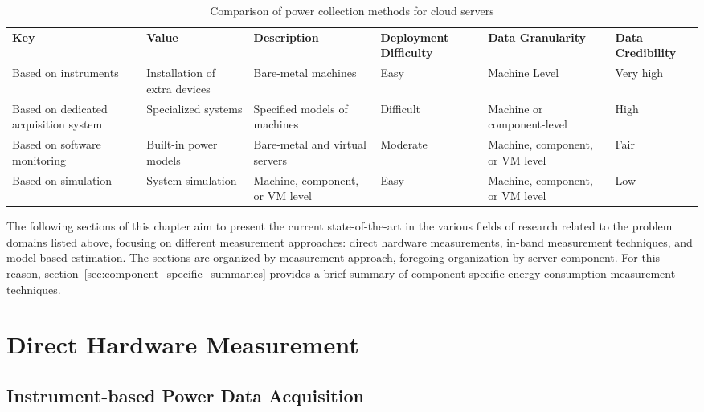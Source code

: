 \begin{table}[h]
    \small
    \centering
    \begin{tabular}{ |L{2.0cm}|L{2.0cm}|L{2.5cm}|L{1.9cm}|L{2.2cm}|L{1.6cm}| } 
        \hline
        \textbf{Key} & \textbf{Value} & \textbf{Description} & \textbf{Deployment Difficulty} & \textbf{Data Granularity} & \textbf{Data Credibility}\\
        \Xhline{1.5pt}
        Based on instruments & Installation of extra devices & Bare-metal machines & Easy & Machine Level & Very high \\
        \hline
        Based on dedicated acquisition system & Specialized systems & Specified models of machines & Difficult & Machine or component-level & High \\
        \hline
        Based on software monitoring & Built-in power models & Bare-metal and virtual servers & Moderate & Machine, component, or VM level & Fair \\
        \hline
        Based on simulation & System simulation & Machine, component, or VM level & Easy & Machine, component, or VM level & Low \\
        \hline
    \end{tabular}
    \caption[Comparison of power collection methods for cloud servers]{Comparison of power collection methods for cloud servers}
    \label{tab:power_collection_methods}
\end{table}

The following sections of this chapter aim to present the current state-of-the-art in the various fields of research related to the problem domains listed above, focusing on different measurement approaches: direct hardware measurements, in-band measurement techniques, and model-based estimation. The sections are organized by measurement approach, foregoing organization by server component. For this reason, section~\ref{sec:component_specific_summaries} provides a brief summary of component-specific energy consumption measurement techniques.

\section{Direct Hardware Measurement}

\subsection{Instrument-based Power Data Acquisition}

